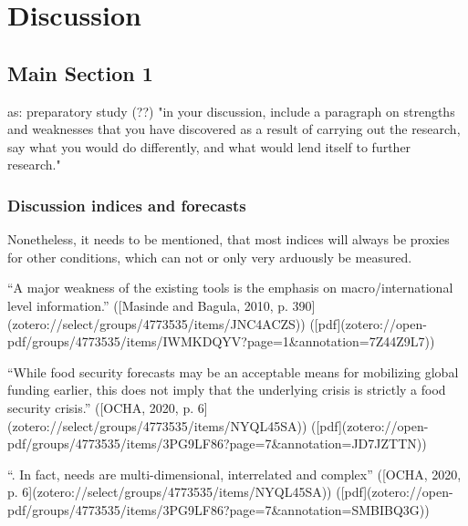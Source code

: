 
\chapter{Discussion} %

\label{Chapter5} %


\section{Main Section 1}
as: preparatory study (??)
"in your discussion, include a paragraph on strengths and weaknesses that you have discovered as a result of carrying out the research, say what you would do differently, and what would lend itself to further research."


\subsection{Discussion indices and forecasts}

Nonetheless, it needs to be mentioned, that most indices will always be proxies for other conditions, which can not or only very arduously be measured. 

“A major weakness of the existing tools is the emphasis on macro/international level information.” ([Masinde and Bagula, 2010, p. 390](zotero://select/groups/4773535/items/JNC4ACZS)) ([pdf](zotero://open-pdf/groups/4773535/items/IWMKDQYV?page=1&annotation=7Z44Z9L7))

“While food security forecasts may be an acceptable means for mobilizing global funding earlier, this does not imply that the underlying crisis is strictly a food security crisis.” ([OCHA, 2020, p. 6](zotero://select/groups/4773535/items/NYQL45SA)) ([pdf](zotero://open-pdf/groups/4773535/items/3PG9LF86?page=7&annotation=JD7JZTTN))

“. In fact, needs are multi-dimensional, interrelated and complex” ([OCHA, 2020, p. 6](zotero://select/groups/4773535/items/NYQL45SA)) ([pdf](zotero://open-pdf/groups/4773535/items/3PG9LF86?page=7&annotation=SMBIBQ3G))

